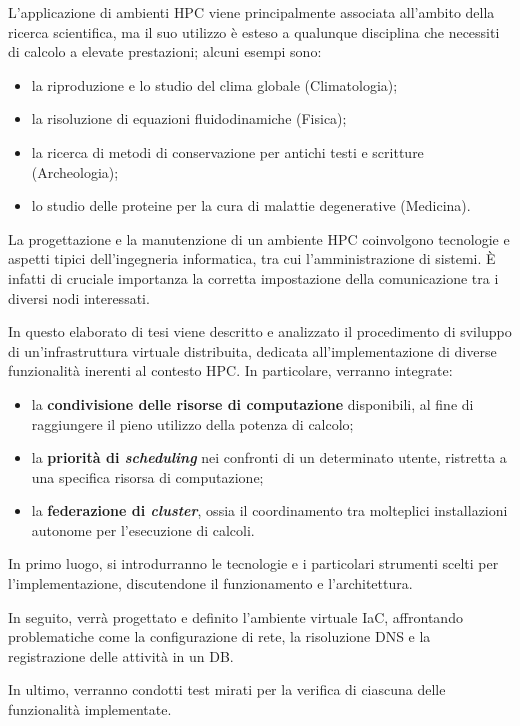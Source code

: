 \documentclass[12pt,a4paper,twoside,openright]{book}
\begin{document}
L'applicazione di ambienti \ac{HPC} viene principalmente associata all'ambito della ricerca scientifica, ma il suo utilizzo è esteso a qualunque disciplina che necessiti di calcolo a elevate prestazioni; alcuni esempi sono:
\begin{itemize}
    \item la riproduzione e lo studio del clima globale (Climatologia);
    \item la risoluzione di equazioni fluidodinamiche (Fisica);
    \item la ricerca di metodi di conservazione per antichi testi e scritture (Archeologia);
    \item lo studio delle proteine per la cura di malattie degenerative (Medicina).
\end{itemize}
La progettazione e la manutenzione di un ambiente \ac{HPC} coinvolgono tecnologie e aspetti tipici dell'ingegneria informatica, tra cui l'amministrazione di sistemi. È infatti di cruciale importanza la corretta impostazione della comunicazione tra i diversi nodi interessati.

In questo elaborato di tesi viene descritto e analizzato il procedimento di sviluppo di un'infrastruttura virtuale distribuita, dedicata all'implementazione di diverse funzionalità inerenti al contesto \ac{HPC}. In particolare, verranno integrate:
\begin{itemize}
    \item la \textbf{condivisione delle risorse di computazione} disponibili, al fine di raggiungere il pieno utilizzo della potenza di calcolo;
    \item la \textbf{priorità di \textit{scheduling}} nei confronti di un determinato utente, ristretta a una specifica risorsa di computazione;
    \item la \textbf{federazione di \textit{cluster}}, ossia il coordinamento tra molteplici installazioni autonome per l'esecuzione di calcoli.
\end{itemize}

In primo luogo, si introdurranno le tecnologie e i particolari strumenti scelti per l'implementazione, discutendone il funzionamento e l'architettura.

In seguito, verrà progettato e definito l'ambiente virtuale \ac{IaC}, affrontando problematiche come la configurazione di rete, la risoluzione \acs{DNS} e la registrazione delle attività in un \acl{DB}.

In ultimo, verranno condotti test mirati per la verifica di ciascuna delle funzionalità implementate.
\end{document}
